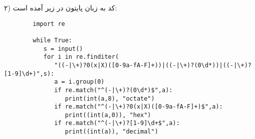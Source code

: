 ۲) کد به زبان پایتون در زیر آمده است:
\begin{latin}
	\begin{verbatim}
		import re   
		
		while True:
		   s = input()
		   for i in re.finditer(
		      "((-|\+)?0(x|X)([0-9a-fA-F]+))|((-|\+)?(0\d*))|((-|\+)?[1-9]\d+)",s):
		      a = i.group(0)
		      if re.match("^(-|\+)?(0\d*)$",a):
		         print(int(a,8), "octate")
		      if re.match("^(-|\+)?0(x|X)([0-9a-fA-F]+)$",a):
		         print((int(a,0)), "hex")
		      if re.match("^(-|\+)?[1-9]\d+$",a):
		         print((int(a)), "decimal")
	\end{verbatim}
\end{latin}